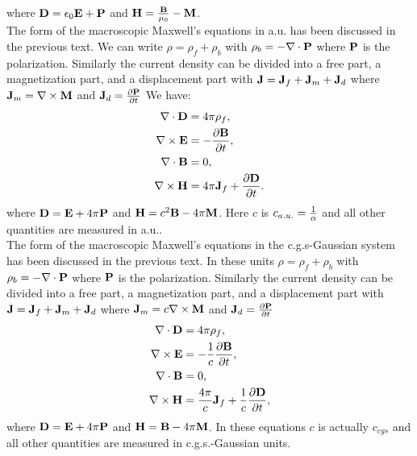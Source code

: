 \documentclass[12pt,a4paper,twoside]{report}
\begin{document}
{where ${\bf D}=\epsilon_0 {\bf E}+{\bf P}$ and ${\bf H}={{\bf B}\over \mu_0}-
{\bf M}$.
\\

{\color{web-blue} The form of the macroscopic Maxwell's equations
in a.u. has been discussed in the previous text.
We can write $\rho=\rho_f+\rho_b$ with $\rho_b=-\nabla \cdot {\bf P}$
where ${\bf P}$ is the polarization.
Similarly the current density can be divided into a free part, a magnetization
part,
and a displacement part with ${\bf J}={\bf J}_f + {\bf J}_m + {\bf J}_d$ where
${\bf J}_m=\nabla \times {\bf M}$ and ${\bf J}_d={\partial {\bf P}\over 
\partial t}$
We have:
\begin{align}
\nabla \cdot {\bf D} &= 4 \pi \rho_f, \\
\nabla \times {\bf E} &= -{\partial {\bf B} \over \partial t}, \\
\nabla \cdot {\bf B} &= 0, \\
\nabla \times {\bf H} &= 4 \pi {\bf J}_f+ {\partial {\bf D} \over 
\partial t}. 
\end{align}
where ${\bf D}={\bf E} + 4 \pi {\bf P}$ and ${\bf H}={c^2
{\bf B}}- 4 \pi {\bf M}$.
Here $c$ is $c_{a.u.}={1\over \alpha}$ and all other quantities are 
measured in a.u..
}
\\

{\color{orange} The form of the macroscopic Maxwell's equations
in the c.g.s-Gaussian system has been discussed in the previous text.
In these units $\rho=\rho_f+\rho_b$ with $\rho_b=-\nabla \cdot {\bf P}$
where ${\bf P}$ is the polarization.
Similarly the current density can be divided into a free part, a 
magnetization part,
and a displacement part with ${\bf J}={\bf J}_f + {\bf J}_m + {\bf J}_d$ where
${\bf J}_m=c \nabla \times {\bf M}$ and ${\bf J}_d={\partial {\bf P}\over 
\partial t}$
\begin{align}
\nabla \cdot {\bf D} &= 4 \pi \rho_f, \\
\nabla \times {\bf E} &= -{1\over c} {\partial {\bf B} \over \partial t}, \\
\nabla \cdot {\bf B} &= 0, \\
\nabla \times {\bf H} &= {4 \pi \over c} {\bf J}_f+ {1\over c}
{\partial {\bf D} \over \partial t}, 
\end{align}
where ${\bf D}={\bf E} + 4 \pi {\bf P}$ and ${\bf H}={\bf B}- 4 \pi {\bf M}$.
In these equations $c$ is actually $c_{cgs}$ and all 
other quantities are measured in c.g.s.-Gaussian units.
}

\newpage

}
\end{document}
